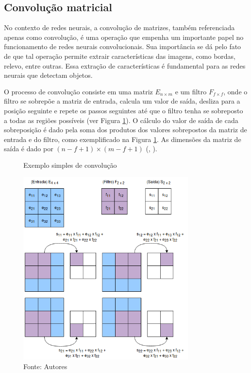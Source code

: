 \documentclass[]{politex}
\begin{document}
\subsection{Convolução matricial}
No contexto de redes neurais, a convolução de matrizes, também referenciada apenas como convolução, é uma operação que empenha um importante papel no funcionamento de redes neurais convolucionais. Sua importância se dá pelo fato de que tal operação permite extrair características das imagens, como bordas, relevo, entre outras. Essa extração de características é fundamental para as redes neurais que detectam objetos.

O processo de convolução consiste em uma matriz \(E_{n \times m}\) e um filtro \(F_{f \times f}\), onde o filtro se sobrepõe a matriz de entrada, calcula um valor de saída, desliza para a posição seguinte e repete os passos seguintes até que o filtro tenha se sobreposto a todas as regiões possíveis (ver Figura \ref{fig:convolucao}). O cálculo do valor de saída de cada sobreposição é dado pela soma dos produtos dos valores sobrepostos da matriz de entrada e do filtro, como exemplificado na Figura \ref{fig:convolucao}. As dimensões da matriz de saída é dado por \( (n-f+1) \times (m-f+1)\) (, \citeyear{cnncourse}).

\begin{figure}[H]
    \centering
    \caption{Exemplo simples de convolução}
    \includegraphics[width=0.8\textwidth]{Convolucao}
    \caption*{Fonte: Autores}
    \label{fig:convolucao}
\end{figure}
\end{document}
